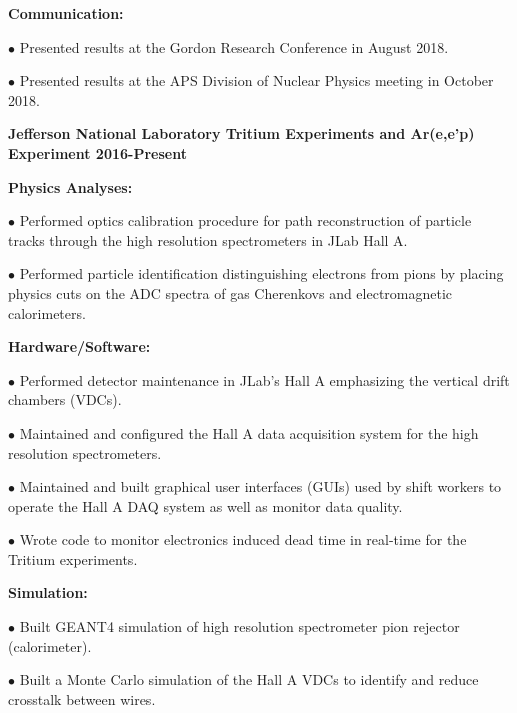 \documentclass[letterpaper,10pt]{article}
\renewenvironment{itemize}{
  \begin{list}{}{
    \setlength{\leftmargin}{1.5em}
  }
}{
  \end{list}
}
\begin{document}
{\begin{itemize}
\begin{itemize}
			\item \textbf{Communication:}
			\begin{itemize}\itemsep5pt
				\item $\bullet$ Presented results at the Gordon Research Conference in August 2018.
				\item $\bullet$ Presented results at the APS Division of Nuclear Physics meeting in October 2018.
			\end{itemize}
	\end{itemize}
	
	\vspace{3mm}
	
 \item {\large {\bf Jefferson National Laboratory Tritium Experiments and Ar(e,e'p) Experiment 2016-Present} }

 \begin{itemize}\itemsep5pt \parskip0pt 
  \item \textbf{Physics Analyses:}
    \begin{itemize}\itemsep5pt \parskip0pt 
     \item $\bullet$ Performed optics calibration procedure for path reconstruction of particle tracks through the high resolution spectrometers in JLab Hall A.
     \item $\bullet$ Performed particle identification distinguishing electrons from pions by placing physics cuts on the ADC spectra of gas Cherenkovs and electromagnetic calorimeters.
     \end{itemize}

  \item \textbf{Hardware/Software:}
    \begin{itemize}\itemsep5pt \parskip0pt 
     \item $\bullet$ Performed detector maintenance in JLab's Hall A emphasizing the vertical drift chambers (VDCs). 
     \item $\bullet$ Maintained and configured the Hall A data acquisition system for the high resolution spectrometers.
     \item $\bullet$ Maintained and built graphical user interfaces (GUIs) used by shift workers to operate the Hall A DAQ system as well as monitor data quality.
     \item $\bullet$ Wrote code to monitor electronics induced dead time in real-time for the Tritium experiments.
    \end{itemize}
    
   \item \textbf{Simulation:}
     \begin{itemize}\itemsep5pt \parskip0pt 
      \item $\bullet$ Built GEANT4 simulation of high resolution spectrometer pion rejector (calorimeter).
      \item $\bullet$ Built a Monte Carlo simulation of the Hall A VDCs to identify and reduce crosstalk between wires. 
     \end{itemize} 
     

\end{itemize}
\end{itemize}}
\end{document}
